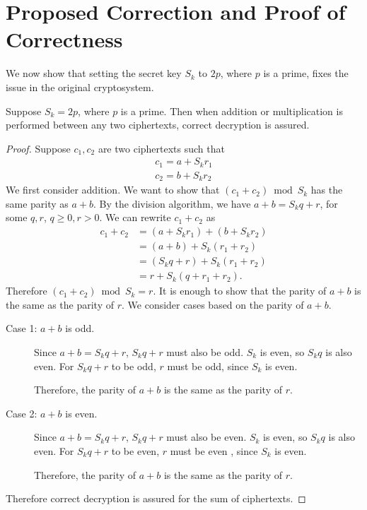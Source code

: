 \section{Proposed Correction and Proof of Correctness}
We now show that setting the secret key $S_k$ to $2p$, where $p$ is a prime, fixes the issue in the original cryptosystem.
\begin{theorem}
	Suppose $S_k = 2p$, where $p$ is a prime. Then when addition or multiplication is performed between any two ciphertexts, correct decryption is assured.
\end{theorem}
\begin{proof}
	Suppose $c_1, c_2$ are two ciphertexts such that
	\begin{align*}
		c_1 = a + S_kr_1\\
		c_2 = b + S_kr_2
	\end{align*}
	We first consider addition. We want to show that $(c_1+c_2)\bmod S_k$ has the same parity as $a+b$.
	By the division algorithm, we have $a+b = S_kq + r$, for some $q,r$, $q \geq 0, r > 0$. We can rewrite $c_1+c_2$ as
	\begin{align*}
		c_1+c_2 &= (a + S_kr_1) + (b + S_kr_2)\\
		&= (a+b)+ S_k(r_1 + r_2)\\
		&= (S_kq + r) + S_k(r_1 + r_2)\\
		&= r + S_k(q + r_1 + r_2).
	\end{align*}
	Therefore $(c_1+c_2)\bmod S_k = r$.
	It is enough to show that the parity of $a+b$ is the same as the parity of $r$. We consider cases based on the parity of $a+b$.
	\begin{description}
		\item[Case 1: $a+b$ is odd.]
			Since $a+b = S_kq + r$, $S_kq + r$ must also be odd.
			$S_k$ is even, so $S_kq$ is also even.
			For $S_kq + r$ to be odd, $r$ must be odd, since $S_k$ is even.

			Therefore, the parity of $a+b$ is the same as the parity of $r$.
		\item[Case 2: $a+b$ is even.]
			Since $a+b = S_kq + r$, $S_kq + r$ must also be even.
			$S_k$ is even, so $S_kq$ is also even. For $S_kq + r$ to be even, $r$ must be even , since $S_k$ is even.

			Therefore, the parity of $a+b$ is the same as the parity of $r$.
	\end{description}
	Therefore correct decryption is assured for the sum of ciphertexts.


\end{proof}
